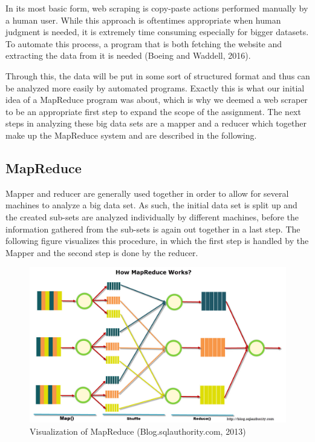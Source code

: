\documentclass[a4paper, 12pt]{article}
\begin{document}
In its most basic form, web scraping is copy-paste actions performed manually by a human user. While this approach is oftentimes appropriate when human judgment is needed, it is extremely time consuming especially for bigger datasets. To automate this process, a program that is both fetching the website and extracting the data from it is needed (Boeing and Waddell, 2016). 

Through this, the data will be put in some sort of structured format and thus can be analyzed more easily by automated programs. Exactly this is what our initial idea of a MapReduce program was about, which is why we deemed a web scraper to be an appropriate first step to expand the scope of the assignment. The next steps in analyzing these big data sets are a mapper and a reducer which together make up the MapReduce system and are described in the following.

\subsection{MapReduce}
Mapper and reducer are generally used together in order to allow for several machines to analyze a big data set. As such, the initial data set is split up and the created sub-sets are analyzed individually by different machines, before the information gathered from the sub-sets is again out together in a last step. The following figure visualizes this procedure, in which the first step is handled by the Mapper and the second step is done by the reducer. 

\begin{figure}[h]
\centering
\includegraphics[width=1\textwidth]{mapreduce}
\caption{Visualization of MapReduce (Blog.sqlauthority.com, 2013)}
\end{figure}
\end{document}
